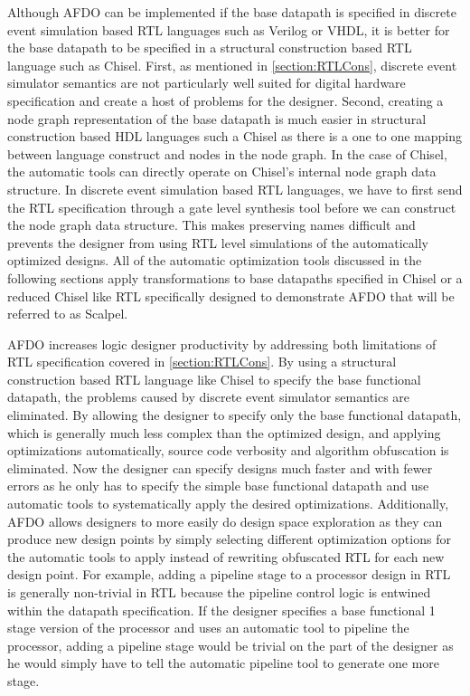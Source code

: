 Although AFDO can be implemented if the base datapath is specified in discrete event simulation based RTL languages such as Verilog or VHDL, it is better for the base datapath to be specified in a structural construction based RTL language such as Chisel. First, as mentioned in \ref{section:RTLCons}, discrete event simulator semantics are not particularly well suited for digital hardware specification and create a host of problems for the designer. Second, creating a node graph representation of the base datapath is much easier in structural construction based HDL languages such a Chisel as there is a one to one mapping between language construct and nodes in the node graph. In the case of Chisel, the automatic tools can directly operate on Chisel’s internal node graph data structure. In discrete event simulation based RTL languages, we have to first send the RTL specification through a gate level synthesis tool before we can construct the node graph data structure. This makes preserving names difficult and prevents the designer from using RTL level simulations of the automatically optimized designs. All of the automatic optimization tools discussed in the following sections apply transformations to base datapaths specified in Chisel or a reduced Chisel like RTL specifically designed to demonstrate AFDO that will be referred to as Scalpel.

AFDO increases logic designer productivity by addressing both limitations of RTL specification covered in \ref{section:RTLCons}. By using a structural construction based RTL language like Chisel to specify the base functional datapath, the problems caused by discrete event simulator semantics are eliminated. By allowing the designer to specify only the base functional datapath, which is generally much less complex than the optimized design, and applying optimizations automatically, source code verbosity and algorithm obfuscation is eliminated. Now the designer can specify designs much faster and with fewer errors as he only has to specify the simple base functional datapath and use automatic tools to systematically apply the desired optimizations. Additionally, AFDO allows designers to more easily do design space exploration as they can produce new design points by simply selecting different optimization options for the automatic tools to apply instead of rewriting obfuscated RTL for each new design point. For example, adding a pipeline stage to a processor design in RTL is generally non-trivial in RTL because the pipeline control logic is entwined within the datapath specification. If the designer specifies a base functional 1 stage version of the processor and uses an automatic tool to pipeline the processor, adding a pipeline stage would be trivial on the part of the designer as he would simply have to tell the automatic pipeline tool to generate one more stage.

